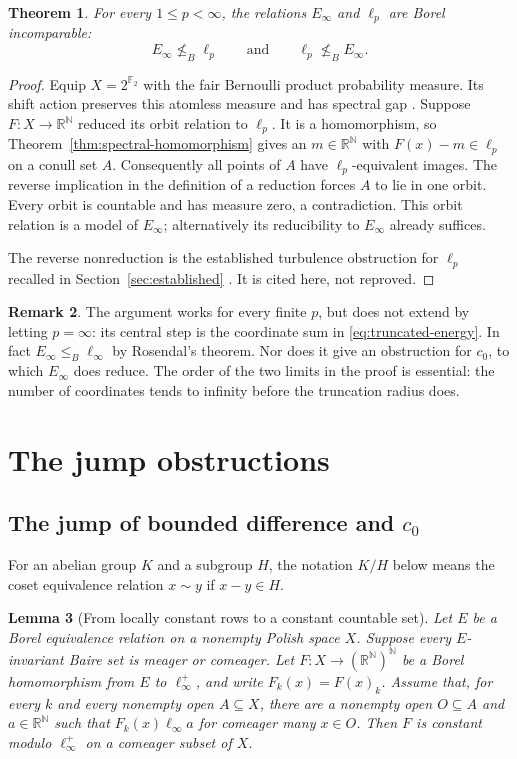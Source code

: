 \documentclass[11pt]{article}
\numberwithin{equation}{section}
\newtheorem{theorem}{Theorem}[section]
\newtheorem{lemma}[theorem]{Lemma}
\theoremstyle{definition}
\newtheorem{remark}[theorem]{Remark}
\newcommand{\N}{\mathbb N}
\newcommand{\R}{\mathbb R}
\begin{document}
\begin{theorem}\label{thm:all-finite-p}
For every $1\le p<\infty$, the relations $E_\infty$ and $\ell_p$
are Borel incomparable:
\[
 E_\infty\nleq_B\ell_p
 \qquad\text{and}\qquad
 \ell_p\nleq_B E_\infty .
\]
\end{theorem}

\begin{proof}
Equip $X=2^{\mathbb F_2}$ with the fair Bernoulli product
probability measure. Its shift action preserves this atomless
measure and has spectral gap \cite[Remark~6.4]{KidaTuckerDrob}.
Suppose $F:X\to\R^\N$ reduced its orbit relation to $\ell_p$.
It is a homomorphism, so Theorem~\ref{thm:spectral-homomorphism}
gives an $m\in\R^\N$ with
$F(x)-m\in\ell_p$ on a conull set $A$.
Consequently all points of $A$ have $\ell_p$-equivalent images.
The reverse implication in the definition of a reduction forces
$A$ to lie in one orbit. Every orbit is countable and has measure
zero, a contradiction.
This orbit relation is a model of $E_\infty$; alternatively its
reducibility to $E_\infty$ already suffices.

The reverse nonreduction is the established turbulence obstruction
for $\ell_p$ recalled in Section~\ref{sec:established}
\cite{HjorthBook,Gao}. It is cited here, not reproved.
\end{proof}

\begin{remark}
The argument works for every finite $p$, but does not extend by
letting $p=\infty$: its central step is the coordinate sum in
\eqref{eq:truncated-energy}. In fact
$E_\infty\le_B\ell_\infty$ by Rosendal's theorem.
Nor does it give an obstruction for $c_0$, to which $E_\infty$
does reduce. The order of the two limits in the proof is essential:
the number of coordinates tends to infinity before the truncation
radius does.
\end{remark}

\section{The jump obstructions}\label{sec:jumps}
\subsection{The jump of bounded difference and \texorpdfstring{$c_0$}{c0}}\label{sec:c0-jump}
For an abelian group $K$ and a subgroup $H$, the notation $K/H$ below
means the coset equivalence relation $x\sim y$ if $x-y\in H$.
\begin{lemma}[From locally constant rows to a constant countable set]
\label{lem:rows}
Let $E$ be a Borel equivalence relation on a nonempty Polish space $X$.
Suppose every $E$-invariant Baire set is meager or comeager. Let
$F:X\to(\mathbb R^{\mathbb N})^{\mathbb N}$ be a Borel homomorphism
from $E$ to $\ell_\infty^+$, and write $F_k(x)=F(x)_k$.
Assume that, for every $k$ and every nonempty open $A\subseteq X$, there
are a nonempty open $O\subseteq A$ and $a\in\mathbb R^{\mathbb N}$ such
that $F_k(x)\mathrel{\ell_\infty}a$ for comeager many $x\in O$.
Then $F$ is constant modulo $\ell_\infty^+$ on a comeager subset of $X$.
\end{lemma}
\end{document}
